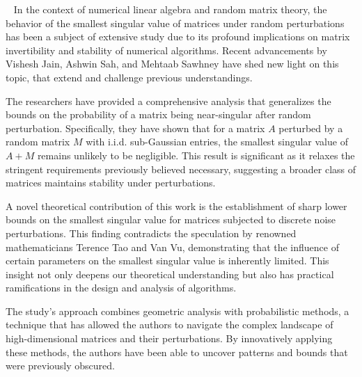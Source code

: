 
~\cite{jain2020smoothed}
In the context of numerical linear algebra and random matrix theory,
the behavior of the smallest singular value of matrices under random
perturbations has been a subject of extensive study due to its profound
implications on matrix invertibility and stability of numerical algorithms.
Recent advancements by Vishesh Jain, Ashwin Sah, and Mehtaab Sawhney have 
shed new light on this topic, that extend and challenge previous
understandings.

The researchers have provided a comprehensive analysis that generalizes
the bounds on the probability of a matrix being near-singular after
random perturbation. Specifically, they have shown that for a matrix
${A}$ perturbed by a random matrix 
${M}$ with i.i.d. sub-Gaussian entries, the smallest singular value
of ${A+M}$ remains unlikely to be negligible. This result is significant
as it relaxes the stringent requirements previously believed necessary,
suggesting a broader class of matrices maintains stability under
perturbations.

A novel theoretical contribution of this work is the establishment 
of sharp lower bounds on the smallest singular value for matrices
subjected to discrete noise perturbations. This finding contradicts
the speculation by renowned mathematicians Terence Tao and Van Vu,
demonstrating that the influence of certain parameters on the smallest
singular value is inherently limited. This insight not only deepens our
theoretical understanding but also has practical ramifications in 
the design and analysis of algorithms.

The study's approach combines geometric
analysis with probabilistic methods, a technique
that has allowed the authors to navigate the complex landscape
of high-dimensional matrices and their perturbations.
By innovatively applying these methods, 
the authors have been able to uncover patterns and bounds
that were previously obscured.
